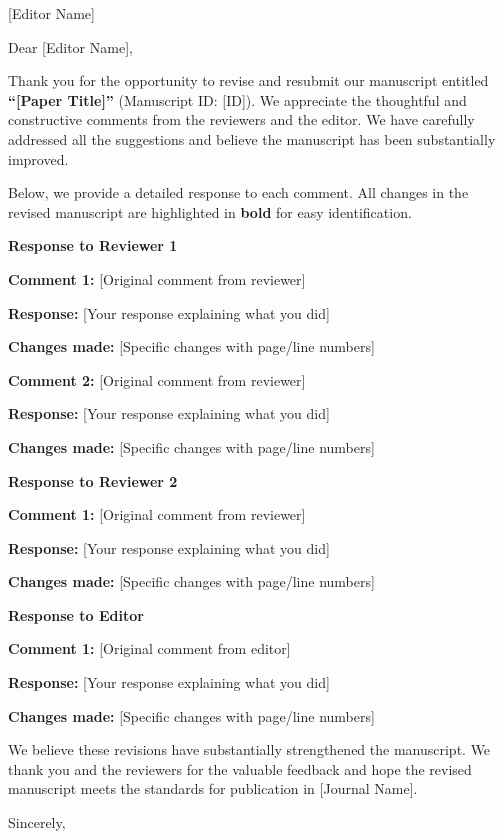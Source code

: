 \documentclass[11pt]{letter}
\begin{document}
\begin{letter}{[Editor Name]\\[Journal Name]}

\opening{Dear [Editor Name],}

Thank you for the opportunity to revise and resubmit our manuscript entitled \textbf{``[Paper Title]''} (Manuscript ID: [ID]). We appreciate the thoughtful and constructive comments from the reviewers and the editor. We have carefully addressed all the suggestions and believe the manuscript has been substantially improved.

Below, we provide a detailed response to each comment. All changes in the revised manuscript are highlighted in \textbf{bold} for easy identification.

\vspace{1em}

\textbf{Response to Reviewer 1}

\vspace{0.5em}

\textbf{Comment 1:} [Original comment from reviewer]

\textbf{Response:} [Your response explaining what you did]

\textbf{Changes made:} [Specific changes with page/line numbers]

\vspace{0.5em}

\textbf{Comment 2:} [Original comment from reviewer]

\textbf{Response:} [Your response explaining what you did]

\textbf{Changes made:} [Specific changes with page/line numbers]

\vspace{1em}

\textbf{Response to Reviewer 2}

\vspace{0.5em}

\textbf{Comment 1:} [Original comment from reviewer]

\textbf{Response:} [Your response explaining what you did]

\textbf{Changes made:} [Specific changes with page/line numbers]

\vspace{1em}

\textbf{Response to Editor}

\vspace{0.5em}

\textbf{Comment 1:} [Original comment from editor]

\textbf{Response:} [Your response explaining what you did]

\textbf{Changes made:} [Specific changes with page/line numbers]

\vspace{1em}

We believe these revisions have substantially strengthened the manuscript. We thank you and the reviewers for the valuable feedback and hope the revised manuscript meets the standards for publication in [Journal Name].

\closing{Sincerely,}

\end{letter}
\end{document}
